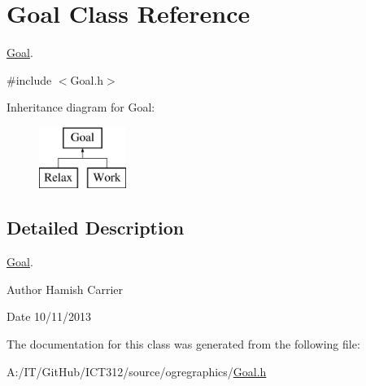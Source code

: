 \hypertarget{class_goal}{\section{Goal Class Reference}
\label{class_goal}
}


\hyperlink{class_goal}{Goal}.  




{\ttfamily \#include $<$Goal.\-h$>$}

Inheritance diagram for Goal\-:\begin{figure}[H]
\begin{center}
\leavevmode
\includegraphics[height=2.000000cm]{class_goal}
\end{center}
\end{figure}


\subsection{Detailed Description}
\hyperlink{class_goal}{Goal}. 

\begin{DoxyAuthor}{Author}
Hamish Carrier 
\end{DoxyAuthor}
\begin{DoxyDate}{Date}
10/11/2013 
\end{DoxyDate}


The documentation for this class was generated from the following file\-:\begin{DoxyCompactItemize}
\item 
A\-:/\-I\-T/\-Git\-Hub/\-I\-C\-T312/source/ogregraphics/\hyperlink{_goal_8h}{Goal.\-h}\end{DoxyCompactItemize}
